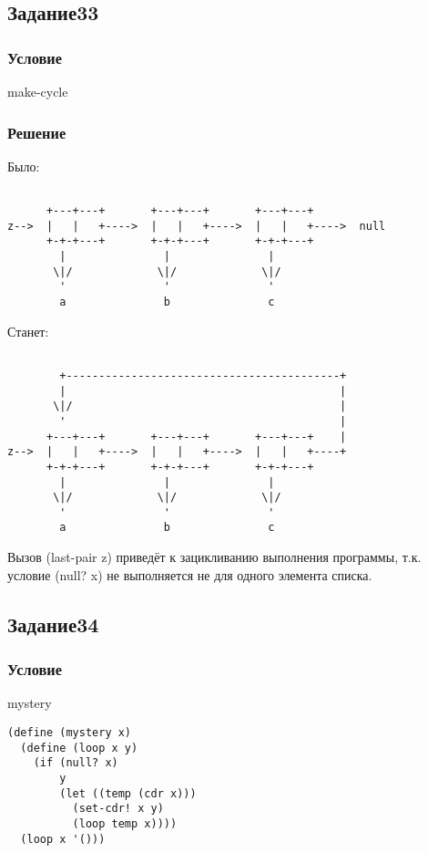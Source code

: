 \documentclass[10pt,a4paper]{article}
\begin{document}
\lstset{ %
basicstyle=\footnotesize,       %
frame=none
}


\subsection*{Задание33}
\subsubsection*{Условие}
make-cycle
\subsubsection*{Решение}

Было:
\begin{lstlisting}

      +---+---+       +---+---+       +---+---+
z-->  |   |   +---->  |   |   +---->  |   |   +---->  null
      +-+-+---+       +-+-+---+       +-+-+---+
        |               |               |
       \|/             \|/             \|/
        '               '               '
        a               b               c

\end{lstlisting}

Станет:
\begin{lstlisting}

        +------------------------------------------+
        |                                          |
       \|/                                         |
        '                                          |
      +---+---+       +---+---+       +---+---+    |
z-->  |   |   +---->  |   |   +---->  |   |   +----+
      +-+-+---+       +-+-+---+       +-+-+---+
        |               |               |
       \|/             \|/             \|/
        '               '               '
        a               b               c

\end{lstlisting}

Вызов (last-pair z) приведёт к зацикливанию выполнения программы,
т.к. условие (null? x) не выполняется не для одного элемента списка.

\subsection*{Задание34}
\subsubsection*{Условие}
mystery
\begin{lstlisting}
(define (mystery x)
  (define (loop x y)
    (if (null? x)
        y
        (let ((temp (cdr x)))
          (set-cdr! x y)
          (loop temp x))))
  (loop x '()))
\end{lstlisting}
\end{document}
